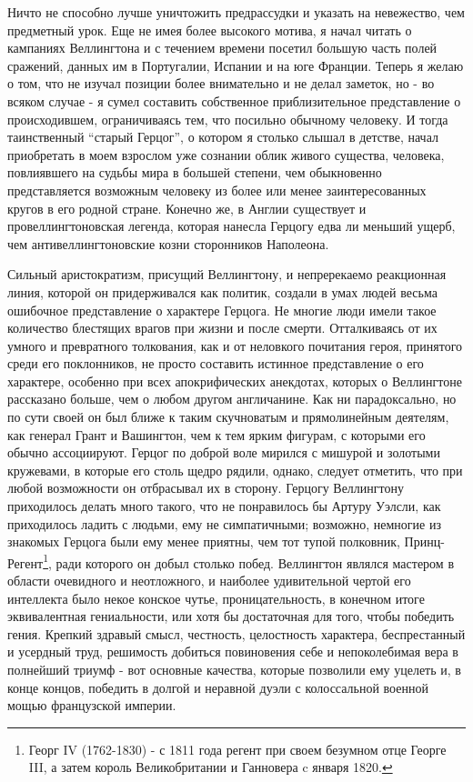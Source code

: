 \documentclass[
  oneside,
  12pt,
  titlepage]{book}
\begin{document}
Ничто не способно лучше уничтожить предрассудки и указать на невежество, чем предметный урок. Еще не имея более высокого мотива, я начал читать о кампаниях Веллингтона и с течением времени посетил большую часть полей сражений, данных им в Португалии, Испании и на юге Франции. Теперь я желаю о том, что не изучал позиции более внимательно и не делал заметок, но - во всяком случае - я сумел составить собственное приблизительное представление о происходившем, ограничиваясь тем, что посильно обычному человеку. И тогда таинственный ``старый Герцог'', о котором я столько слышал в детстве, начал приобретать в моем взрослом уже сознании облик живого существа, человека, повлиявшего на судьбы мира в большей степени, чем обыкновенно представляется возможным человеку из более или менее заинтересованных кругов в его родной стране. Конечно же, в Англии существует и провеллингтоновская легенда, которая нанесла Герцогу едва ли меньший ущерб, чем антивеллингтоновские козни сторонников Наполеона.

Сильный аристократизм, присущий Веллингтону, и непререкаемо реакционная линия, которой он придерживался как политик, создали в умах людей весьма ошибочное представление о характере Герцога. Не многие люди имели такое количество блестящих врагов при жизни и после смерти. Отталкиваясь от их умного и превратного толкования, как и от неловкого почитания героя, принятого среди его поклонников, не просто составить истинное представление о его характере, особенно при всех апокрифических анекдотах, которых о Веллингтоне рассказано больше, чем о любом другом англичанине. Как ни парадоксально, но по сути своей он был ближе к таким скучноватым и прямолинейным деятелям, как генерал Грант и Вашингтон, чем к тем ярким фигурам, с которыми его обычно ассоциируют. Герцог по доброй воле мирился с мишурой и золотыми кружевами, в которые его столь щедро рядили, однако, следует отметить, что при любой возможности он отбрасывал их в сторону. Герцогу Веллингтону приходилось делать много такого, что не понравилось бы Артуру Уэлсли, как приходилось ладить с людьми, ему не симпатичными; возможно, немногие из знакомых Герцога были ему менее приятны, чем тот тупой полковник, Принц-Регент\footnote{Георг IV (1762-1830) - с 1811 года регент при своем безумном отце Георге III, а затем король Великобритании и Ганновера c января 1820.}, ради которого он добыл столько побед. Веллингтон являлся мастером в области очевидного и неотложного, и наиболее удивительной чертой его интеллекта было некое конское чутье, проницательность, в конечном итоге эквивалентная гениальности, или хотя бы достаточная для того, чтобы победить гения. Крепкий здравый смысл, честность, целостность характера, беспрестанный и усердный труд, решимость добиться повиновения себе и непоколебимая вера в полнейший триумф - вот основные качества, которые позволили ему уцелеть и, в конце концов, победить в долгой и неравной дуэли с колоссальной военной мощью французской империи.
\end{document}
